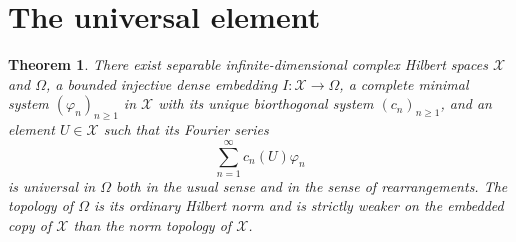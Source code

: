 \documentclass[11pt]{article}
\newtheorem{theorem}{Theorem}
\begin{document}
\section{The universal element}

\begin{theorem}\label{thm:main}
There exist separable infinite-dimensional complex Hilbert spaces
$\mathcal X$ and $\Omega$, a bounded injective dense embedding
$I:\mathcal X\to\Omega$, a complete minimal system
$(\varphi_n)_{n\geq1}$ in $\mathcal X$ with its unique biorthogonal system
$(c_n)_{n\geq1}$, and an element $U\in\mathcal X$ such that its Fourier
series
\[
  \sum_{n=1}^\infty c_n(U)\varphi_n
\]
is universal in $\Omega$ both in the usual sense and in the sense of
rearrangements.  The topology of $\Omega$ is its ordinary Hilbert norm and is
strictly weaker on the embedded copy of $\mathcal X$ than the norm topology
of $\mathcal X$.
\end{theorem}
\end{document}
